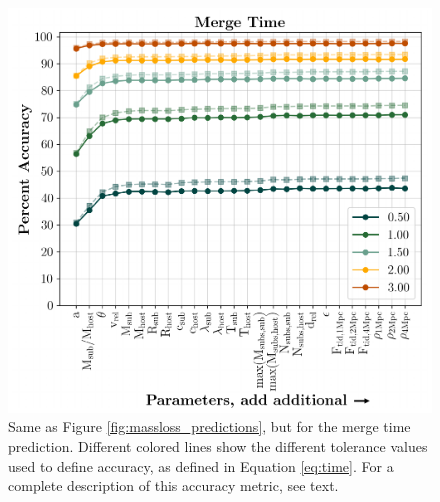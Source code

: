 \documentclass[fleqn,usenatbib]{mnras}
\begin{document}
{\begin{figure}
	\includegraphics[width=\columnwidth]{Figures/time_predictions}
	\vspace{-15pt}
    \caption{Same as Figure \ref{fig:massloss_predictions}, but for the merge time prediction. Different colored lines show the different tolerance values used to define accuracy, as defined in Equation \ref{eq:time}. For a complete description of this accuracy metric, see text.}
    \label{fig:time_predictions}
\end{figure}

}
\end{document}
